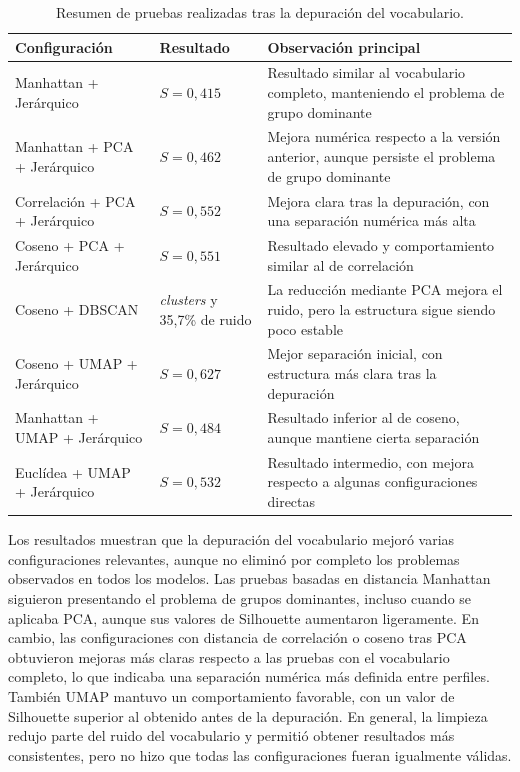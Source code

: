 \documentclass[11pt,spanish,listoffigures,listoftables]{tfgetsinf}
\begin{document}
\begin{table}[H]
\centering
\small
\renewcommand{\arraystretch}{1.25}
\begin{tabular}{
>{\centering\arraybackslash}m{}
>{\centering\arraybackslash}m{}
m{}
}
\hline
\textbf{Configuración} & \textbf{Resultado} & \textbf{Observación principal} \\
\hline
Manhattan + Jerárquico & \(S=0,415\) & Resultado similar al vocabulario completo, manteniendo el problema de grupo dominante \\
\hline
Manhattan + PCA + Jerárquico & \(S=0,462\) & Mejora numérica respecto a la versión anterior, aunque persiste el problema de grupo dominante \\
\hline
Correlación + PCA + Jerárquico & \(S=0,552\) & Mejora clara tras la depuración, con una separación numérica más alta \\
\hline
Coseno + PCA + Jerárquico & \(S=0,551\) & Resultado elevado y comportamiento similar al de correlación \\
\hline
Coseno + DBSCAN & 2 \textit{clusters} y 35,7\% de ruido & La reducción mediante PCA mejora el ruido, pero la estructura sigue siendo poco estable \\
\hline
Coseno + UMAP + Jerárquico & \(S=0,627\) & Mejor separación inicial, con estructura más clara tras la depuración \\
\hline
Manhattan + UMAP + Jerárquico & \(S=0,484\) & Resultado inferior al de coseno, aunque mantiene cierta separación \\
\hline
Euclídea + UMAP + Jerárquico & \(S=0,532\) & Resultado intermedio, con mejora respecto a algunas configuraciones directas \\
\hline
\end{tabular}
\caption{Resumen de pruebas realizadas tras la depuración del vocabulario.}
\label{tab:pruebas_embeddings_sin_localizacion}
\end{table}

Los resultados muestran que la depuración del vocabulario mejoró varias configuraciones relevantes, aunque no eliminó por completo los problemas observados en todos los modelos. Las pruebas basadas en distancia Manhattan siguieron presentando el problema de grupos dominantes, incluso cuando se aplicaba PCA, aunque sus valores de Silhouette aumentaron ligeramente. En cambio, las configuraciones con distancia de correlación o coseno tras PCA obtuvieron mejoras más claras respecto a las pruebas con el vocabulario completo, lo que indicaba una separación numérica más definida entre perfiles. También UMAP mantuvo un comportamiento favorable, con un valor de Silhouette superior al obtenido antes de la depuración. En general, la limpieza redujo parte del ruido del vocabulario y permitió obtener resultados más consistentes, pero no hizo que todas las configuraciones fueran igualmente válidas.
\end{document}
